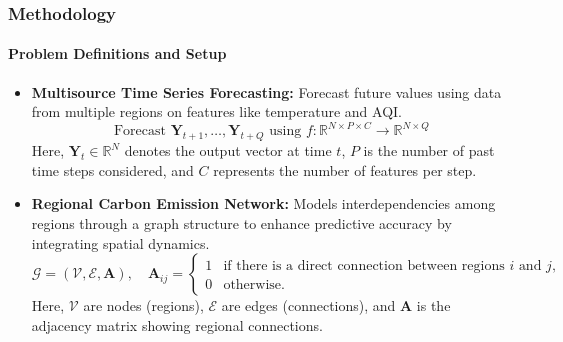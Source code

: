 \documentclass[light]{lutbeamer} %
\begin{document}
\begin{frame}
    \frametitle{Methodology}
    \framesubtitle{Problem Definitions and Setup}
    \begin{itemize}
        \item \textbf{Multisource Time Series Forecasting:}
              Forecast future values using data from multiple regions on features like temperature and AQI.
              \[
                  \text{Forecast } \bm{Y}_{t+1}, \dots, \bm{Y}_{t+Q} \text{ using } f:\mathbb{R}^{N \times P \times C} \rightarrow \mathbb{R}^{N \times Q}
              \]
              Here, \( \bm{Y}_t \in \mathbb{R}^N \) denotes the output vector at time \( t \), \( P \) is the number of past time steps considered, and \( C \) represents the number of features per step.

        \item \textbf{Regional Carbon Emission Network:}
              Models interdependencies among regions through a graph structure to enhance predictive accuracy by integrating spatial dynamics.
              \[
                  \mathcal{G} = (\mathcal{V}, \mathcal{E}, \bm{A}), \quad \bm{A}_{ij} =
                  \begin{cases}
                      1 & \text{if there is a direct connection between regions } i \text{ and } j, \\
                      0 & \text{otherwise.}
                  \end{cases}
              \]
              Here, \( \mathcal{V} \) are nodes (regions), \( \mathcal{E} \) are edges (connections), and \( \bm{A} \) is the adjacency matrix showing regional connections.
    \end{itemize}
\end{frame}
\end{document}

